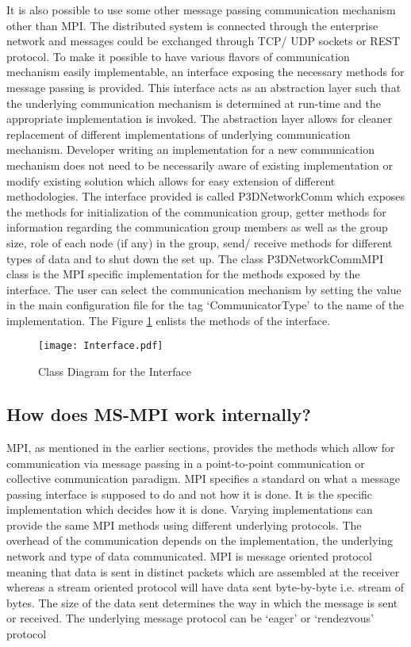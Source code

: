 It is also possible to use some other message passing communication mechanism other than MPI. The distributed system is connected through the enterprise network and messages could be exchanged through TCP/ UDP sockets or REST protocol. To make it possible to have various flavors of communication mechanism easily implementable, an interface exposing the necessary methods for message passing is provided. This interface acts as an abstraction layer such that the underlying communication mechanism is determined at run-time and the appropriate implementation is invoked. The abstraction layer allows for cleaner replacement of different implementations of underlying communication mechanism. Developer writing an implementation for a new communication mechanism does not need to be necessarily aware of existing implementation or modify existing solution which allows for easy extension of different methodologies. \newline
The interface provided is called P3DNetworkComm which exposes the methods for initialization of the communication group, getter methods for information regarding the communication group members as well as the group size, role of each node (if any) in the group, send/ receive methods for different types of data and to shut down the set up. The class P3DNetworkCommMPI class is the MPI specific implementation for the methods exposed by the interface. The user can select the communication mechanism by setting the value in the main configuration file for the tag {\lq}CommunicatorType{\rq} to the name of the implementation. The Figure \ref{fig:InterfaceDiagram} enlists the methods of the interface. 

\begin{figure}[ht!]
\centering
\texttt{[image: Interface.pdf]}
\caption{Class Diagram for the Interface}
\label{fig:InterfaceDiagram}
\end{figure}


\subsection{How does MS-MPI work internally?}

MPI, as mentioned in the earlier sections, provides the methods which allow for communication via message passing in a point-to-point communication or collective communication paradigm. MPI specifies a standard on what a message passing interface is supposed to do and not how it is done. It is the specific implementation which decides how it is done. Varying implementations can provide the same MPI methods using different underlying protocols. The overhead of the communication depends on the implementation, the underlying network and type of data communicated. MPI is message oriented protocol meaning that data is sent in distinct packets which are assembled at the receiver whereas a stream oriented protocol will have data sent byte-by-byte i.e. stream of bytes. The size of the data sent determines the way in which the message is sent or received. The underlying message protocol can be {\lq}eager{\rq} or {\lq}rendezvous{\rq} protocol\newline 

